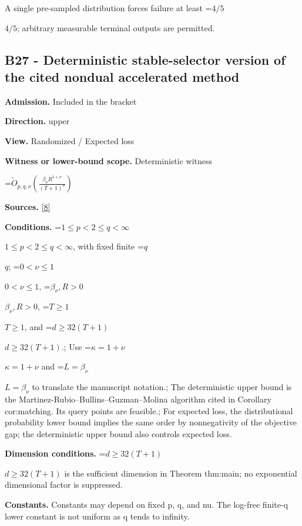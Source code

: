\documentclass[10pt,a4paper]{article}
\newcommand{\AtlasMath}[1]{\par\begingroup\centering\setbox0=\hbox{$\displaystyle #1$}\ifdim\wd0>1.4\linewidth\typeout{ATLAS WIDE FORMULA: \the\wd0}\fi\ifdim\wd0>\linewidth\resizebox{\linewidth}{!}{\box0}\else\box0\fi\par\endgroup}
\newcommand{\AtlasInlineMath}[1]{\begingroup\setbox0=\hbox{$#1$}\ifdim\wd0>.4\linewidth\endgroup\AtlasMath{#1}\else\endgroup$#1$\fi}
\begin{document}
A single pre-sampled distribution forces failure at least \AtlasInlineMath{4/5}; arbitrary measurable terminal outputs are permitted.



\subsection{B27 - Deterministic stable-selector version of the cited nondual accelerated method}


\textbf{Admission.} Included in the bracket



\textbf{Direction.} upper



\textbf{View.} Randomized / Expected loss



\textbf{Witness or lower-bound scope.} Deterministic witness



\AtlasMath{\widetilde O_{p,q,\nu}\!\left(\frac{\beta_\nu R^{1+\nu}}{(T+1)^a}\right)}


\textbf{Sources.} \href{https://github.com/WU-Wendao/Colombo/blob/main/colombo_sensorium/Complexity_altas/data/sources/colombo/B1/manuscript.pdf}{[8]}



\textbf{Conditions.} \AtlasInlineMath{1\le p<2\le q<\infty}, with fixed finite \AtlasInlineMath{q}; \AtlasInlineMath{0<\nu\le1}, \AtlasInlineMath{\beta_\nu,R>0}, \AtlasInlineMath{T\ge1}, and \AtlasInlineMath{d\ge32(T+1)}.; Use \AtlasInlineMath{\kappa=1+\nu} and \AtlasInlineMath{L=\beta_\nu} to translate the manuscript notation.; The deterministic upper bound is the Martinez-Rubio--Bullins--Guzman--Molina algorithm cited in Corollary cor:matching. Its query points are feasible.; For expected loss, the distributional probability lower bound implies the same order by nonnegativity of the objective gap; the deterministic upper bound also controls expected loss.



\textbf{Dimension conditions.} \AtlasInlineMath{d\ge32(T+1)} is the sufficient dimension in Theorem thm:main; no exponential dimensional factor is suppressed.



\textbf{Constants.} Constants may depend on fixed p, q, and nu. The log-free finite-q lower constant is not uniform as q tends to infinity.
\end{document}
